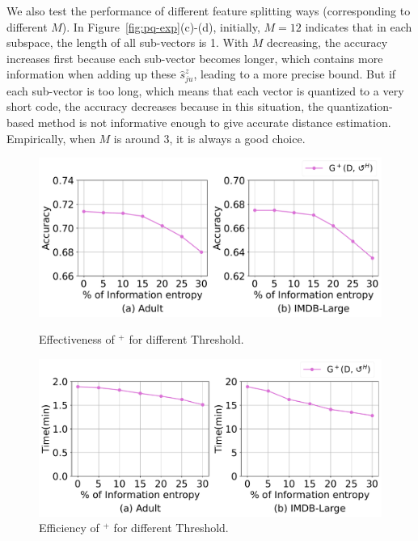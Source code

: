 We also test the performance of different feature splitting ways (corresponding to different $M$). In Figure~\ref{fig:pq-exp}(c)-(d), initially,  $M=12$ indicates that in each subspace, the length of all sub-vectors is 1. With $M$ decreasing, the accuracy increases first because each sub-vector becomes longer, which contains more information when adding up these $\hat{s}^z_{ju}$, leading to a more precise bound. But if each sub-vector is too long, which means that each vector is quantized to a very short code, the accuracy decreases because in this situation, the quantization-based method is not informative enough to give accurate  distance estimation. Empirically, when $M$ is around 3, it is always a good choice.

\begin{figure}[t]   
	\centering
	\begin{minipage}[t]{0.49\textwidth}
		\centering
		\includegraphics[width=\columnwidth]{figs/entropy_acc}
		\vspace{-1.5em}
		\caption{Effectiveness of \ours$^+$ for different Threshold.}
		\label{fig:entropy_acc}
	\end{minipage}
	\begin{minipage}[t]{0.49\textwidth}
		\centering
		\includegraphics[width=\columnwidth]{figs/entropy_time}
		\vspace{-1.5em}
		\caption{Efficiency of \ours$^+$ for different Threshold.}
		\label{fig:entropy_time}
	\end{minipage}
	\vspace*{-1em}   
\end{figure}
